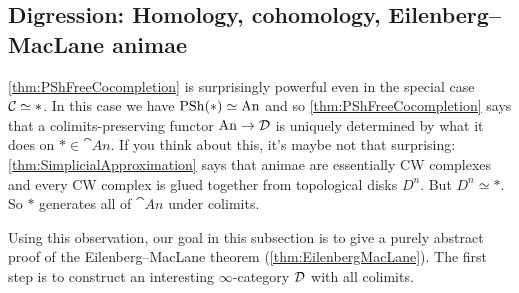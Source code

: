 \subsection{Digression: Homology, cohomology, Eilenberg--MacLane animae}\label{subsec:EilenbergMacLane}
\cref{thm:PShFreeCocompletion} is surprisingly powerful even in the special case $\mathcal{C}\simeq *$. In this case we have $\operatorname{PSh}(*)\simeq \mathrm{An}$ and so  \cref{thm:PShFreeCocompletion} says that a colimits-preserving functor $\mathrm{An}\rightarrow\mathcal{D}$ is uniquely determined by what it does on $*\in\cat{An}$. If you think about this, it's maybe not that surprising: \cref{thm:SimplicialApproximation} says that animae are essentially CW complexes and every CW complex is glued together from topological disks $D^n$. But $D^n\simeq *$. So $*$ generates all of $\cat{An}$ under colimits.

Using this observation, our goal in this subsection is to give a purely abstract proof of the Eilenberg--MacLane theorem (\cref{thm:EilenbergMacLane}). The first step is to construct an interesting $\infty$-category $\mathcal{D}$ with all colimits.

